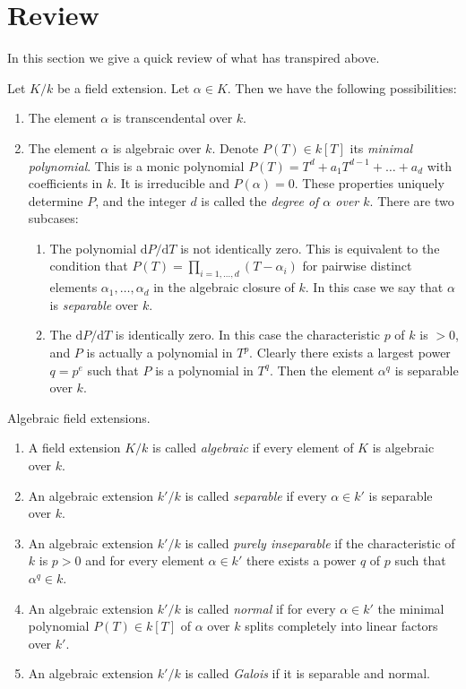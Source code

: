 \section{Review}
\label{section-algebraic}

\noindent
In this section we give a quick review of what has transpired above.

\medskip\noindent
Let $K/k$ be a field extension. Let $\alpha \in K$. Then we have the
following possibilities:
\begin{enumerate}
\item The element $\alpha$ is transcendental over $k$.
\item The element $\alpha$ is algebraic over $k$. Denote
$P(T) \in k[T]$ its {\it minimal polynomial}. This is a monic polynomial
$P(T) = T^d + a_1 T^{d - 1} + \ldots + a_d$ with coefficients in
$k$. It is irreducible and $P(\alpha) = 0$. These properties
uniquely determine $P$, and the integer $d$ is called the
{\it degree of $\alpha$ over $k$}. There are two subcases:
\begin{enumerate}
\item The polynomial $\text{d}P/\text{d}T$ is not identically zero.
This is equivalent to the condition that
$P(T) = \prod_{i = 1, \ldots, d} (T - \alpha_i)$ for
pairwise distinct elements $\alpha_1, \ldots, \alpha_d$
in the algebraic closure of $k$.
In this case we say that $\alpha$ is {\it separable} over $k$.
\item The $\text{d}P/\text{d}T$ is identically zero. In this case the
characteristic $p$ of $k$ is $ > 0$, and $P$ is actually a polynomial
in $T^p$. Clearly there exists a largest power $q = p^e$ such that $P$ is
a polynomial in $T^q$. Then the element $\alpha^q$ is separable over $k$.
\end{enumerate}
\end{enumerate}

\begin{definition}
\label{definition-separable-algebraic}
Algebraic field extensions.
\begin{enumerate}
\item A field extension $K/k$ is called {\it algebraic}
if every element of $K$ is algebraic over $k$.
\item An algebraic extension $k'/k$ is called {\it separable}
if every $\alpha \in k'$ is separable over $k$.
\item An algebraic
extension $k'/k$ is called {\it purely inseparable} if
the characteristic of $k$ is $p > 0$ and for every element
$\alpha \in k'$ there exists a power $q$ of $p$ such that
$\alpha^q \in k$.
\item An algebraic extension $k'/k$ is called {\it normal}
if for every $\alpha \in k'$ the minimal polynomial $P(T) \in k[T]$
of $\alpha$ over $k$ splits completely into linear factors over $k'$.
\item An algebraic extension $k'/k$ is called {\it Galois}
if it is separable and normal.
\end{enumerate}
\end{definition}

